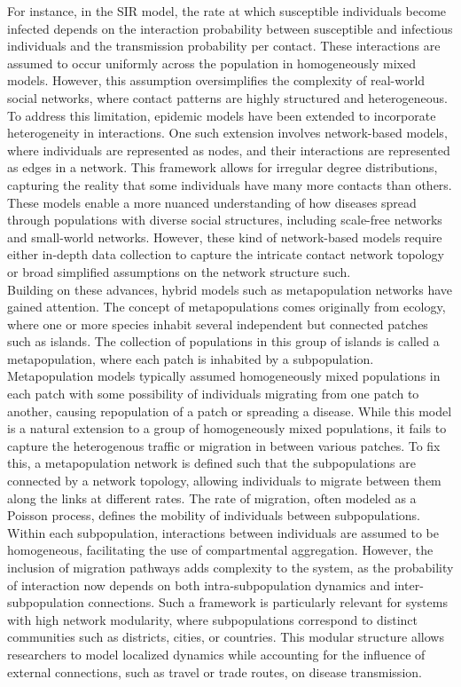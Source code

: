 For instance, in the SIR model, the rate at which susceptible individuals become infected depends on the interaction probability between susceptible and infectious individuals and the transmission probability per contact. These interactions are assumed to occur uniformly across the population in homogeneously mixed models. However, this assumption oversimplifies the complexity of real-world social networks, where contact patterns are highly structured and heterogeneous.\\

To address this limitation, epidemic models have been extended to incorporate heterogeneity in interactions. One such extension involves network-based models, where individuals are represented as nodes, and their interactions are represented as edges in a network. This framework allows for irregular degree distributions, capturing the reality that some individuals have many more contacts than others. These models enable a more nuanced understanding of how diseases spread through populations with diverse social structures, including scale-free networks and small-world networks. However, these kind of network-based models require either in-depth data collection to capture the intricate contact network topology or broad simplified assumptions on the network structure such.\cite{shao2022epidemic}\\

Building on these advances, hybrid models such as metapopulation networks have gained attention. The concept of metapopulations comes originally from ecology, where one or more species inhabit several independent but connected patches such as islands. The collection of populations in this group of islands is called a metapopulation, where each patch is inhabited by a subpopulation. Metapopulation models typically assumed homogeneously mixed populations in each patch with some possibility of individuals migrating from one patch to another, causing repopulation of a patch or spreading a disease.\cite{hanski1997metapopulation} While this model is a natural extension to a group of homogeneously mixed populations, it fails to capture the heterogenous traffic or migration in between various patches. To fix this, a metapopulation network is defined such that the subpopulations are connected by a network topology, allowing individuals to migrate between them along the links at different rates. The rate of migration, often modeled as a Poisson process, defines the mobility of individuals between subpopulations. Within each subpopulation, interactions between individuals are assumed to be homogeneous, facilitating the use of compartmental aggregation. However, the inclusion of migration pathways adds complexity to the system, as the probability of interaction now depends on both intra-subpopulation dynamics and inter-subpopulation connections.\cite{watts2005multiscale} Such a framework is particularly relevant for systems with high network modularity, where subpopulations correspond to distinct communities such as districts, cities, or countries. This modular structure allows researchers to model localized dynamics while accounting for the influence of external connections, such as travel or trade routes, on disease transmission.\\

